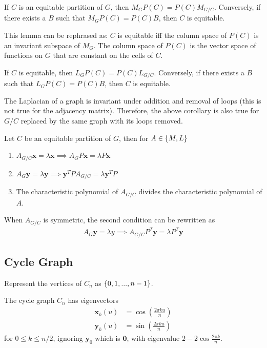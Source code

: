 \documentclass{math}
\renewcommand{\vec}[1]{\boldsymbol{#1}}
\begin{document}
\begin{lemma}
    If $C$ is an equitable partition of $G$, then $M_{G}P(C) = P(C)M_{G/C}$. Conversely, if there exists a $B$ such that $M_G P(C) = P(C) B$, then $C$ is equitable.
\end{lemma}

This lemma can be rephrased as: $C$ is equitable iff the column space of $P(C)$ is an invariant subspace of $M_G$.
The column space of $P(C)$ is the vector space of functions on $G$ that are constant on the cells of $C$.

\begin{corollary}
    If $C$ is equitable, then $L_{G}P(C) = P(C)L_{G/C}$. Conversely, if there exists a $B$ such that $L_G P(C) = P(C) B$, then $C$ is equitable.
\end{corollary}

The Laplacian of a graph is invariant under addition and removal of loops (this is not true for the adjacency matrix).
Therefore, the above corollary is also true for $G/C$ replaced by the same graph with its loops removed.

\begin{theorem}
    Let $C$ be an equitable partition of $G$, then for $A \in \{ M, L \}$
    \begin{enumerate}
        \item $A_{G/C}\vec{x} = \lambda \vec{x} \implies A_GP\vec{x} = \lambda P \vec{x}$
        \item $A_G \vec{y} = \lambda \vec{y} \implies \vec{y}^T P A_{G/C} = \lambda \vec{y}^T P$
        \item The characteristic polynomial of $A_{G/C}$ divides the characteristic polynomial of $A$.
    \end{enumerate}
\end{theorem}

When $A_{G/C}$ is symmetric, the second condition can be rewritten as
\begin{align*}
    A_G \vec{y} = \lambda y \implies A_{G/C} P^T \vec{y} = \lambda P^T \vec{y}
\end{align*}

\subsection{Cycle Graph}

Represent the vertices of $C_n$ as $\{ 0, 1, ..., n - 1 \}$.
\begin{theorem}
    The cycle graph $C_n$ has eigenvectors
    \begin{align*}
        \vec{x}_k (u) &= \cos(\frac{2\pi k u}{n}) \\
        \vec{y}_k (u) &= \sin(\frac{2\pi k u}{n})
    \end{align*}
    for $0 \leq k \leq n/2$, ignoring $\vec{y}_0$ which is $\vec{0}$,
    with eigenvalue $2 - 2 \cos \frac{2\pi k}{n}$.
\end{theorem}
\end{document}
